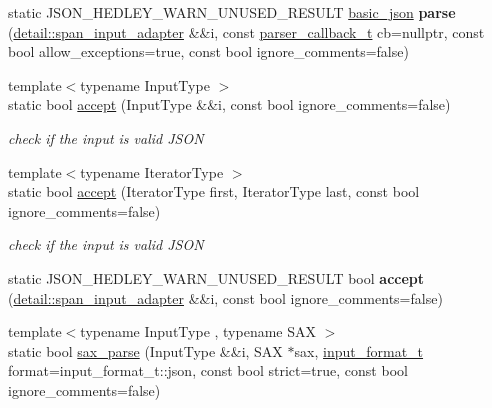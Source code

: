 \begin{DoxyCompactItemize}
\mbox{\label{classnlohmann_1_1basic__json_a73cf15644f04fa569f50291049d1bafd}} 
static J\+S\+O\+N\+\_\+\+H\+E\+D\+L\+E\+Y\+\_\+\+W\+A\+R\+N\+\_\+\+U\+N\+U\+S\+E\+D\+\_\+\+R\+E\+S\+U\+LT \hyperlink{classnlohmann_1_1basic__json}{basic\+\_\+json} {\bfseries parse} (\hyperlink{classnlohmann_1_1detail_1_1span__input__adapter}{detail\+::span\+\_\+input\+\_\+adapter} \&\&i, const \hyperlink{classnlohmann_1_1basic__json_a0273d074462644e5d5a7ff313ad0d742}{parser\+\_\+callback\+\_\+t} cb=nullptr, const bool allow\+\_\+exceptions=true, const bool ignore\+\_\+comments=false)
\item 
{\footnotesize template$<$typename Input\+Type $>$ }\\static bool \hyperlink{classnlohmann_1_1basic__json_a32872afe5bfd040777e3e2bb85f0ca55}{accept} (Input\+Type \&\&i, const bool ignore\+\_\+comments=false)
\begin{DoxyCompactList}\small\item\em check if the input is valid J\+S\+ON \end{DoxyCompactList}\item 
{\footnotesize template$<$typename Iterator\+Type $>$ }\\static bool \hyperlink{classnlohmann_1_1basic__json_a47fb596473649332185aedb0a8a6ccc5}{accept} (Iterator\+Type first, Iterator\+Type last, const bool ignore\+\_\+comments=false)
\begin{DoxyCompactList}\small\item\em check if the input is valid J\+S\+ON \end{DoxyCompactList}\item 
\mbox{\label{classnlohmann_1_1basic__json_a6d9e85910b91d02f6807b69b61690a4b}} 
static J\+S\+O\+N\+\_\+\+H\+E\+D\+L\+E\+Y\+\_\+\+W\+A\+R\+N\+\_\+\+U\+N\+U\+S\+E\+D\+\_\+\+R\+E\+S\+U\+LT bool {\bfseries accept} (\hyperlink{classnlohmann_1_1detail_1_1span__input__adapter}{detail\+::span\+\_\+input\+\_\+adapter} \&\&i, const bool ignore\+\_\+comments=false)
\item 
{\footnotesize template$<$typename Input\+Type , typename S\+AX $>$ }\\static bool \hyperlink{classnlohmann_1_1basic__json_a12b382c6407da5543827ce4b24bb5008}{sax\+\_\+parse} (Input\+Type \&\&i, S\+AX $\ast$sax, \hyperlink{namespacenlohmann_1_1detail_aa554fc6a11519e4f347deb25a9f0db40}{input\+\_\+format\+\_\+t} format=input\+\_\+format\+\_\+t\+::json, const bool strict=true, const bool ignore\+\_\+comments=false)

\end{DoxyCompactItemize}
